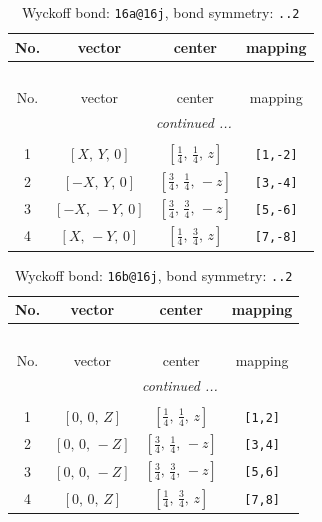 \documentclass[fleqn,8pt]{jsarticle}
\begin{document}
\begin{longtable}{cccc}
\caption{Wyckoff bond: {\tt 16a@16j}, bond symmetry: {\tt ..2}}
 \\
 \hline \hline
No. & vector & center & mapping \\ \hline \endfirsthead

\multicolumn{3}{l}{\tablename\ \thetable{}} \\
 \hline \hline
No. & vector & center & mapping \\ \hline \endhead

 \hline \hline
\multicolumn{3}{r}{\footnotesize\it continued ...} \\ \endfoot

 \hline \hline
\multicolumn{3}{r}{} \\ \endlastfoot

1 & $\left[ X,\, Y,\, 0 \right]$ & $\left[ \frac{1}{4},\, \frac{1}{4},\, z \right]$ & {\tt [1,-2]} \\ \hline
2 & $\left[ - X,\, Y,\, 0 \right]$ & $\left[ \frac{3}{4},\, \frac{1}{4},\, - z \right]$ & {\tt [3,-4]} \\ \hline
3 & $\left[ - X,\, - Y,\, 0 \right]$ & $\left[ \frac{3}{4},\, \frac{3}{4},\, - z \right]$ & {\tt [5,-6]} \\ \hline
4 & $\left[ X,\, - Y,\, 0 \right]$ & $\left[ \frac{1}{4},\, \frac{3}{4},\, z \right]$ & {\tt [7,-8]} \\
\end{longtable}
\renewcommand{\arraystretch}{1.2}
\begin{longtable}{cccc}
\caption{Wyckoff bond: {\tt 16b@16j}, bond symmetry: {\tt ..2}}
 \\
 \hline \hline
No. & vector & center & mapping \\ \hline \endfirsthead

\multicolumn{3}{l}{\tablename\ \thetable{}} \\
 \hline \hline
No. & vector & center & mapping \\ \hline \endhead

 \hline \hline
\multicolumn{3}{r}{\footnotesize\it continued ...} \\ \endfoot

 \hline \hline
\multicolumn{3}{r}{} \\ \endlastfoot

1 & $\left[ 0,\, 0,\, Z \right]$ & $\left[ \frac{1}{4},\, \frac{1}{4},\, z \right]$ & {\tt [1,2]} \\ \hline
2 & $\left[ 0,\, 0,\, - Z \right]$ & $\left[ \frac{3}{4},\, \frac{1}{4},\, - z \right]$ & {\tt [3,4]} \\ \hline
3 & $\left[ 0,\, 0,\, - Z \right]$ & $\left[ \frac{3}{4},\, \frac{3}{4},\, - z \right]$ & {\tt [5,6]} \\ \hline
4 & $\left[ 0,\, 0,\, Z \right]$ & $\left[ \frac{1}{4},\, \frac{3}{4},\, z \right]$ & {\tt [7,8]} \\
\end{longtable}
\end{document}
